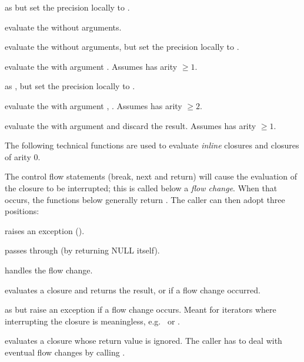  as
 but set the precision locally to .

 evaluate the 
 without arguments.

 evaluate the 
 without arguments, but set the precision locally to .

 evaluate the 
 with argument . Assumes  has arity $\geq 1$.

 as
, but set the precision locally to .

 evaluate the 
 with argument , . Assumes  has arity $\geq 2$.

 evaluate the 
 with argument  and discard the result. Assumes 
has arity $\geq 1$.

The following technical functions are used to evaluate \emph{inline}
closures and closures of arity 0.

The control flow statements (break, next and return) will cause the
evaluation of the closure to be interrupted; this is called below a
\emph{flow change}. When that occurs, the functions below generally
 return . The caller can then adopt three positions:

\item raises an exception ().

\item passes through (by returning NULL itself).

\item handles the flow change.

 evaluates a closure and returns the result,
or  if a flow change occurred.

 as  but raise
an exception if a flow change occurs. Meant for iterators where
interrupting the closure is meaningless, e.g.~ or .

 evaluates a closure whose return
value is ignored. The caller has to deal with eventual flow changes by
calling .

